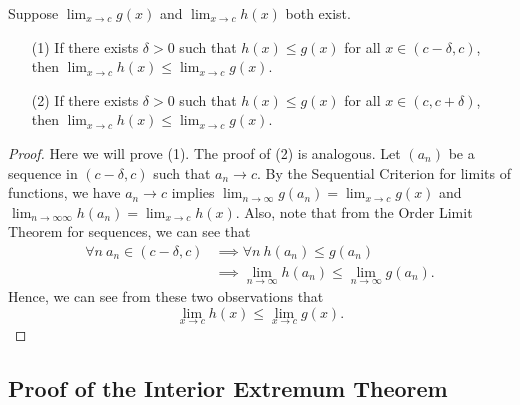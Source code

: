 \begin{lemma}
    Suppose \( \lim_{ x \to c  }  g(x)  \) and \( \lim_{ x \to c  }  h(x) \) both exist. 
    \begin{enumerate}
        \item[(1)] If there exists \( \delta > 0  \) such that \( h(x) \leq g(x) \) for all \( x \in (c -  \delta, c ) \), then \( \lim_{ x \to c  }  h(x) \leq \lim_{ x \to c  }  g(x) \).
        \item[(2)] If there exists \( \delta > 0  \) such that \( h(x) \leq g(x) \) for all \( x \in (c , c + \delta) \), then \( \lim_{ x \to c  }  h(x) \leq \lim_{ x \to c  }  g(x) \).
    \end{enumerate}
\end{lemma}
\begin{proof}
Here we will prove (1). The proof of (2) is analogous. Let \( ({a}_{n}) \) be a sequence in \( (c - \delta, c) \) such that \( {a}_{n} \to c  \). By the Sequential Criterion for limits of functions, we have \( {a}_{n} \to c  \) implies
\( \lim_{ n \to \infty  }  g({a}_{n}) = \lim_{ x \to c  }  g(x) \) and \( \lim_{ n \to \infty \infty   } h({a}_{n}) = \lim_{ x \to c  }  h(x) \). Also, note that from the Order Limit Theorem for sequences, we can see that   
\begin{align*}
    \forall n \ {a}_{n} \in (c - \delta, c ) &\implies \forall n \ h({a}_{n}) \leq g({a}_{n}) \\
                                             &\implies \lim_{ n \to \infty  }  h({a}_{n}) \leq \lim_{ n \to \infty  }  g({a}_{n}).
\end{align*}
Hence, we can see from these two observations that 
\[  \lim_{ x \to c  }  h(x) \leq \lim_{ x \to c  }  g(x). \]
\end{proof}

\subsection{Proof of the Interior Extremum Theorem}

